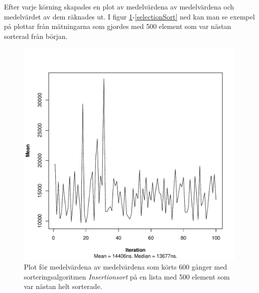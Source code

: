 \documentclass[a4paper]{article}
\begin{document}
Efter varje körning skapades en plot av medelvärdena av medelvärdena och medelvärdet av dem räknades ut. I figur \ref{insertionSort}-\ref{selectionSort} ned kan man se exempel på plottar från mätningarna som gjordes med 500 element som var nästan sorterad från början.

\begin{figure}[H]
	\begin{center}
		\includegraphics[scale=0.4]{output/500/AlmostSorted/insertionSort_almost_sorted_500_600_100.pdf}
		\caption{Plot för medelvärdena av medelvärdena som körts 600 gånger med sorteringsalgoritmen \emph{Insertionsort} på en lista med 500 element som var nästan helt sorterade.}
		\label{insertionSort}
	\end{center}
\end{figure}
\end{document}
